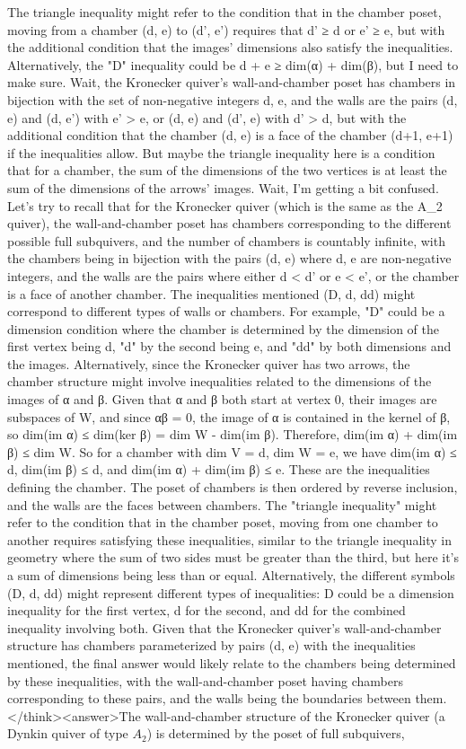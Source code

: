 The triangle inequality might refer to the condition that in the chamber poset, moving from a chamber (d, e) to (d', e') requires that d' ≥ d or e' ≥ e, but with the additional condition that the images' dimensions also satisfy the inequalities. Alternatively, the "D" inequality could be d + e ≥ dim(α) + dim(β), but I need to make sure. Wait, the Kronecker quiver's wall-and-chamber poset has chambers in bijection with the set of non-negative integers d, e, and the walls are the pairs (d, e) and (d, e') with e' > e, or (d, e) and (d', e) with d' > d, but with the additional condition that the chamber (d, e) is a face of the chamber (d+1, e+1) if the inequalities allow. But maybe the triangle inequality here is a condition that for a chamber, the sum of the dimensions of the two vertices is at least the sum of the dimensions of the arrows' images. Wait, I'm getting a bit confused. Let's try to recall that for the Kronecker quiver (which is the same as the A_2 quiver), the wall-and-chamber poset has chambers corresponding to the different possible full subquivers, and the number of chambers is countably infinite, with the chambers being in bijection with the pairs (d, e) where d, e are non-negative integers, and the walls are the pairs where either d < d' or e < e', or the chamber is a face of another chamber. The inequalities mentioned (D, d, dd) might correspond to different types of walls or chambers. For example, "D" could be a dimension condition where the chamber is determined by the dimension of the first vertex being d, "d" by the second being e, and "dd" by both dimensions and the images. Alternatively, since the Kronecker quiver has two arrows, the chamber structure might involve inequalities related to the dimensions of the images of α and β. Given that α and β both start at vertex 0, their images are subspaces of W, and since αβ = 0, the image of α is contained in the kernel of β, so dim(im α) ≤ dim(ker β) = dim W - dim(im β). Therefore, dim(im α) + dim(im β) ≤ dim W. So for a chamber with dim V = d, dim W = e, we have dim(im α) ≤ d, dim(im β) ≤ d, and dim(im α) + dim(im β) ≤ e. These are the inequalities defining the chamber. The poset of chambers is then ordered by reverse inclusion, and the walls are the faces between chambers. The "triangle inequality" might refer to the condition that in the chamber poset, moving from one chamber to another requires satisfying these inequalities, similar to the triangle inequality in geometry where the sum of two sides must be greater than the third, but here it's a sum of dimensions being less than or equal. Alternatively, the different symbols (D, d, dd) might represent different types of inequalities: D could be a dimension inequality for the first vertex, d for the second, and dd for the combined inequality involving both. Given that the Kronecker quiver's wall-and-chamber structure has chambers parameterized by pairs (d, e) with the inequalities mentioned, the final answer would likely relate to the chambers being determined by these inequalities, with the wall-and-chamber poset having chambers corresponding to these pairs, and the walls being the boundaries between them.</think><answer>The wall-and-chamber structure of the Kronecker quiver (a Dynkin quiver of type \(A_2\)) is determined by the poset of full subquivers, 